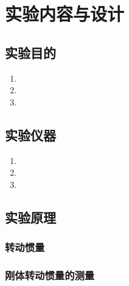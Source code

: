 
\section{实验内容与设计}

\subsection{实验目的}
    \begin{enumerate}
        \item 
        \item 
        \item 
    \end{enumerate}

\subsection{实验仪器}

    \begin{enumerate}
        \item 
        \item 
        \item 
    \end{enumerate}



\subsection{实验原理}
\subsubsection{转动惯量}  

\subsubsection{刚体转动惯量的测量}


   
